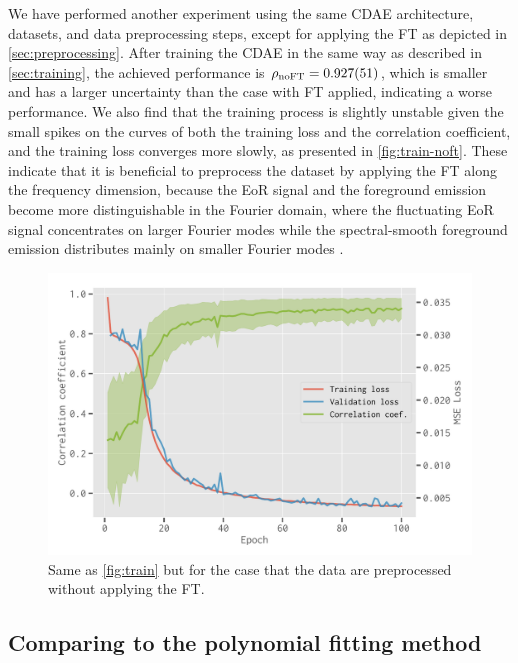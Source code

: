 \documentclass[fleqn,usenatbib]{mnras}
\newlength{\myfigwidth}
\newcommand{\R}[1]{\mathrm{#1}}
\begin{document}
We have performed another experiment using the same CDAE architecture,
datasets, and data preprocessing steps, except for applying the FT
as depicted in \autoref{sec:preprocessing}.
After training the CDAE in the same way as described in
\autoref{sec:training}, the achieved performance is
$\rho_{\R{noFT}} = \num{0.927 +- 0.051}$, which is smaller and has a
larger uncertainty than the case with FT applied, indicating a worse
performance.
We also find that the training process is slightly unstable given the
small spikes on the curves of both the training loss and the correlation
coefficient, and the training loss converges more slowly,
as presented in \autoref{fig:train-noft}.
These indicate that it is beneficial to preprocess the
dataset by applying the FT along the frequency dimension, because the
EoR signal and the foreground emission become more distinguishable
in the Fourier domain, where the fluctuating EoR signal concentrates on
larger Fourier modes while the spectral-smooth foreground emission
distributes mainly on smaller Fourier modes \citep[e.g.,][]{parsons2012}.

\begin{figure}
  \centering
  \includegraphics[width=\myfigwidth]{cdae-train-noft}
  \caption{\label{fig:train-noft}%
    Same as \autoref{fig:train} but for the case that the data are
    preprocessed without applying the FT.
  }
\end{figure}


\subsection{Comparing to the polynomial fitting method}
\label{sec:polyfit}
\end{document}
